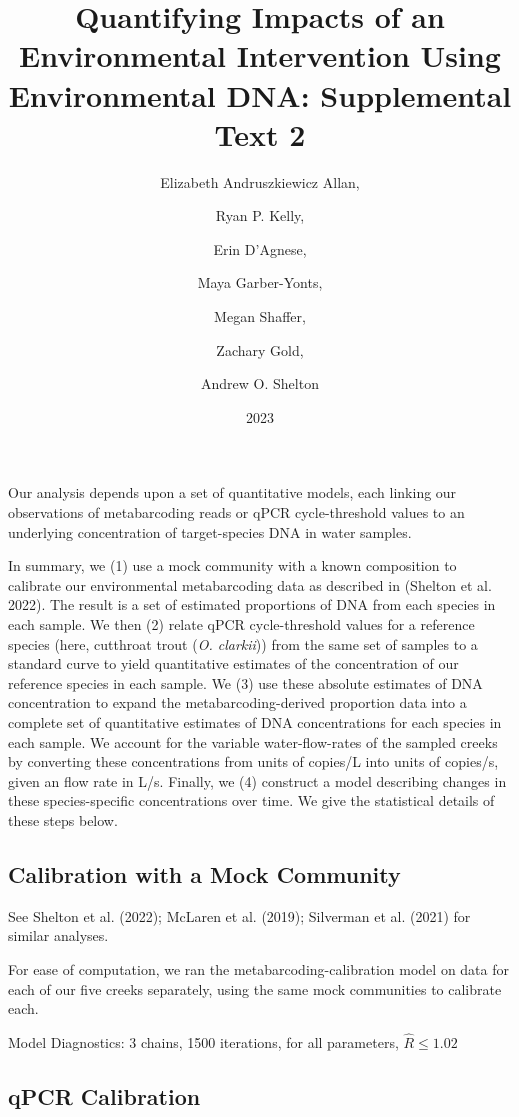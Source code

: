 \documentclass[
]{article}
\title{Quantifying Impacts of an Environmental Intervention Using
Environmental DNA: Supplemental Text 2}
\author{Elizabeth Andruszkiewicz Allan, \and Ryan P. Kelly, \and Erin
D'Agnese, \and Maya Garber-Yonts, \and Megan Shaffer, \and Zachary
Gold, \and Andrew O. Shelton}
\date{2023}
\begin{document}
\maketitle

Our analysis depends upon a set of quantitative models, each linking our
observations of metabarcoding reads or qPCR cycle-threshold values to an
underlying concentration of target-species DNA in water samples.

In summary, we (1) use a mock community with a known composition to
calibrate our environmental metabarcoding data as described in (Shelton
et al. 2022). The result is a set of estimated proportions of DNA from
each species in each sample. We then (2) relate qPCR cycle-threshold
values for a reference species (here, cutthroat trout (\emph{O.
clarkii})) from the same set of samples to a standard curve to yield
quantitative estimates of the concentration of our reference species in
each sample. We (3) use these absolute estimates of DNA concentration to
expand the metabarcoding-derived proportion data into a complete set of
quantitative estimates of DNA concentrations for each species in each
sample. We account for the variable water-flow-rates of the sampled
creeks by converting these concentrations from units of copies/L into
units of copies/s, given an flow rate in L/s. Finally, we (4) construct
a model describing changes in these species-specific concentrations over
time. We give the statistical details of these steps below.

\hypertarget{calibration-with-a-mock-community}{%
\subsection{Calibration with a Mock
Community}\label{calibration-with-a-mock-community}}

See Shelton et al. (2022); McLaren et al. (2019); Silverman et al.
(2021) for similar analyses.

For ease of computation, we ran the metabarcoding-calibration model on
data for each of our five creeks separately, using the same mock
communities to calibrate each.

Model Diagnostics: 3 chains, 1500 iterations, for all parameters,
\(\hat{R} \leq 1.02\)

\hypertarget{qpcr-calibration}{%
\subsection{qPCR Calibration}\label{qpcr-calibration}}
\end{document}
